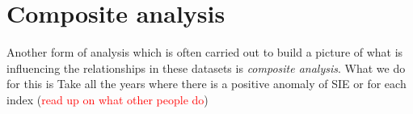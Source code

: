 \section{Composite analysis}

Another form of analysis which is often carried out to build a picture of what is influencing the relationships in these datasets is \textit{composite analysis}. What we do for this is Take all the years where there is a positive anomaly of SIE or for each index (\textcolor{red}{read up on what other people do})